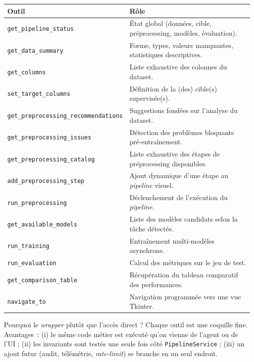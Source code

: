 \documentclass[11pt,a4paper]{report}
\begin{document}
\begin{center}
\begin{tabular}{!{\color{accent}\vrule width 2pt}L{6cm} L{8cm}}
\toprule
\textbf{Outil} & \textbf{R\^ole} \\
\midrule
\texttt{get\_pipeline\_status}           & \'Etat global (donn\'ees, cible, pr\'eprocessing, mod\`eles, \'evaluation). \\
\texttt{get\_data\_summary}              & Forme, types, valeurs manquantes, statistiques descriptives. \\
\texttt{get\_columns}                    & Liste exhaustive des colonnes du dataset. \\
\texttt{set\_target\_columns}            & D\'efinition de la (des) cible(s) supervis\'ee(s). \\
\texttt{get\_preprocessing\_recommendations} & Suggestions fond\'ees sur l'analyse du dataset. \\
\texttt{get\_preprocessing\_issues}      & D\'etection des probl\`emes bloquants pr\'e-entra\^inement. \\
\texttt{get\_preprocessing\_catalog}     & Liste exhaustive des \'etapes de pr\'eprocessing disponibles. \\
\texttt{add\_preprocessing\_step}        & Ajout dynamique d'une \'etape au \textit{pipeline} visuel. \\
\texttt{run\_preprocessing}              & D\'eclenchement de l'ex\'ecution du \textit{pipeline}. \\
\texttt{get\_available\_models}          & Liste des mod\`eles candidats selon la t\^ache d\'etect\'ee. \\
\texttt{run\_training}                   & Entra\^inement multi-mod\`eles asynchrone. \\
\texttt{run\_evaluation}                 & Calcul des m\'etriques sur le jeu de test. \\
\texttt{get\_comparison\_table}          & R\'ecup\'eration du tableau comparatif des performances. \\
\texttt{navigate\_to}                    & Navigation programm\'ee vers une vue Tkinter. \\
\bottomrule
\end{tabular}
\end{center}

\begin{techbox}{Pourquoi le \textit{wrapper} plut\^ot que l'acc\`es direct ?}
Chaque outil est une coquille fine. Avantages~: (i) le m\^eme code
m\'etier est ex\'ecut\'e qu'on vienne de l'agent ou de l'UI ; (ii)
les invariants sont test\'es une seule fois c\^ot\'e
\texttt{PipelineService} ; (iii) un ajout futur (audit, t\'el\'em\'etrie,
\textit{rate-limit}) se branche en un seul endroit.
\end{techbox}
\end{document}
